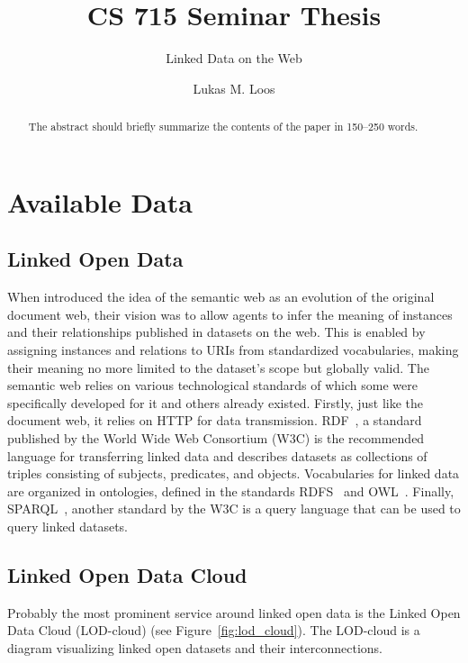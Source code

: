 \documentclass[runningheads]{llncs}
\begin{document}
%
    \title{CS 715 Seminar Thesis}
    \subtitle{Linked Data on the Web}
%
%
    \author{Lukas M. Loos}
%
%
%
    \maketitle              %
%
    \begin{abstract}
        The abstract should briefly summarize the contents of the paper in
        150--250 words.

    \end{abstract}
%
%
%


    \section{Available Data}

    \subsection{Linked Open Data}
    When \citet{berners2001semantic} introduced the idea of the semantic web as an evolution of the original document web, their vision was to allow agents to infer the meaning of instances and their relationships published in datasets on the web.
    This is enabled by assigning instances and relations to URIs from standardized vocabularies, making their meaning no more limited to the dataset's scope but globally valid.
    The semantic web relies on various technological standards of which some were specifically developed for it and others already existed.
    Firstly, just like the document web, it relies on HTTP for data transmission.
    RDF~\citep{RDF}, a standard published by the World Wide Web Consortium (W3C) is the recommended language for transferring linked data and describes datasets as collections of triples consisting of subjects, predicates, and objects.
    Vocabularies for linked data are organized in ontologies, defined in the standards RDFS~\citep{RDFS} and OWL~\citep{OWL}.
    Finally, SPARQL~\citep{SPARQL}, another standard by the W3C is a query language that can be used to query linked datasets.

    \subsection{Linked Open Data Cloud}
    Probably the most prominent service around linked open data is the Linked Open Data Cloud (LOD-cloud)
    \footnotemark{} (see Figure~\ref{fig:lod_cloud}).
    The LOD-cloud is a diagram visualizing linked open datasets and their interconnections.
\end{document}
